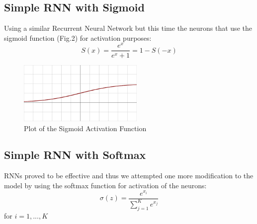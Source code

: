 \documentclass[12pt, conference]{IEEEtran}
\begin{document}

\subsection{Simple RNN with Sigmoid}
Using a similar Recurrent Neural Network but this time the neurons that use the sigmoid function (Fig.2) for activation purposes:
$$
S(x)=\frac {e^{x}}{e^{x}+1}=1-S(-x)
$$
\begin{figure}[h]
\centering
\includegraphics[width=6cm]{images/sigmoid.png}
\caption{Plot of the Sigmoid Activation Function}
\end{figure}


\subsection{Simple RNN with Softmax}
RNNs proved to be effective and thus we attempted one more modification to the model by using the softmax function for activation of the neurons:
$$
\sigma (z) = \frac{e^{x_{i}}}{\sum_{j=1}^{K}e^{x_{j}}}
$$
for $ i = 1,...,K$\\

\end{document}
